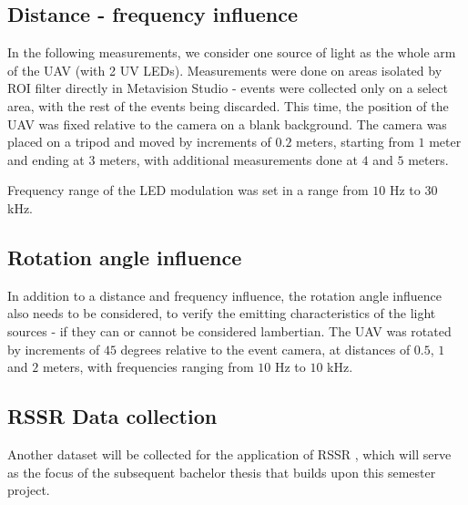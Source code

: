 \subsection{Distance - frequency influence}

In the following measurements, we consider one source of light as the whole arm of the UAV (with 2 UV LEDs). Measurements were
done on areas isolated by ROI filter directly in Metavision Studio - events were collected only on a select area, with the
rest of the events being discarded.
This time, the position of the UAV was fixed relative to the camera on a blank background. The camera was placed on a tripod
and moved by increments of $0.2$ meters, starting from $1$ meter and ending at $3$ meters, with additional measurements done
at $4$ and $5$ meters.

Frequency range of the LED modulation was set in a range from $10$ Hz to $30$ kHz.

\subsection{Rotation angle influence}

In addition to a distance and frequency influence, the rotation angle influence also needs to be considered, to
verify the emitting characteristics of the light sources - if they can or cannot be considered lambertian.
The UAV was rotated by increments of $45$ degrees relative to the event camera, at distances of $0.5$, $1$ and $2$ meters,
with frequencies ranging from $10$ Hz to $10$ kHz. 

\subsection{RSSR Data collection}

Another dataset will be collected for the application of \ac{RSSR} \cite{bai2021vlp},
which will serve as the focus of the subsequent bachelor thesis that builds upon this semester project.